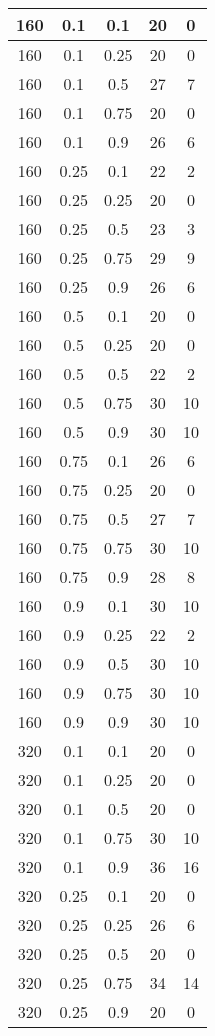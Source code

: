 \documentclass{bmstu}
\begin{document}
\begin{center}
\begin{longtable}[c]{|c|c|c|c|c|}
160 & 0.1 & 0.1 & 20 & 0 \\\hline
160 & 0.1 & 0.25 & 20 & 0 \\\hline
160 & 0.1 & 0.5 & 27 & 7 \\\hline
160 & 0.1 & 0.75 & 20 & 0 \\\hline
160 & 0.1 & 0.9 & 26 & 6 \\\hline
160 & 0.25 & 0.1 & 22 & 2 \\\hline
160 & 0.25 & 0.25 & 20 & 0 \\\hline
160 & 0.25 & 0.5 & 23 & 3 \\\hline
160 & 0.25 & 0.75 & 29 & 9 \\\hline
160 & 0.25 & 0.9 & 26 & 6 \\\hline
160 & 0.5 & 0.1 & 20 & 0 \\\hline
160 & 0.5 & 0.25 & 20 & 0 \\\hline
160 & 0.5 & 0.5 & 22 & 2 \\\hline
160 & 0.5 & 0.75 & 30 & 10 \\\hline
160 & 0.5 & 0.9 & 30 & 10 \\\hline
160 & 0.75 & 0.1 & 26 & 6 \\\hline
160 & 0.75 & 0.25 & 20 & 0 \\\hline
160 & 0.75 & 0.5 & 27 & 7 \\\hline
160 & 0.75 & 0.75 & 30 & 10 \\\hline
160 & 0.75 & 0.9 & 28 & 8 \\\hline
160 & 0.9 & 0.1 & 30 & 10 \\\hline
160 & 0.9 & 0.25 & 22 & 2 \\\hline
160 & 0.9 & 0.5 & 30 & 10 \\\hline
160 & 0.9 & 0.75 & 30 & 10 \\\hline
160 & 0.9 & 0.9 & 30 & 10 \\\hline
320 & 0.1 & 0.1 & 20 & 0 \\\hline
320 & 0.1 & 0.25 & 20 & 0 \\\hline
320 & 0.1 & 0.5 & 20 & 0 \\\hline
320 & 0.1 & 0.75 & 30 & 10 \\\hline
320 & 0.1 & 0.9 & 36 & 16 \\\hline
320 & 0.25 & 0.1 & 20 & 0 \\\hline
320 & 0.25 & 0.25 & 26 & 6 \\\hline
320 & 0.25 & 0.5 & 20 & 0 \\\hline
320 & 0.25 & 0.75 & 34 & 14 \\\hline
320 & 0.25 & 0.9 & 20 & 0 \\\hline

\end{longtable}
\end{center}
\end{document}
